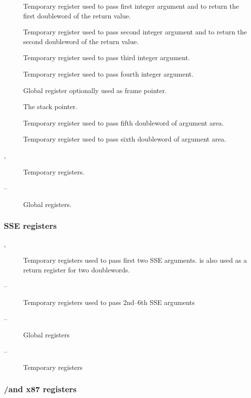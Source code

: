 \begin{description}
  \item [\RAX]
    Temporary register used to pass first integer argument and to return
    the first doubleword of the return value.
  \item [\RDX]
    Temporary register used to pass second integer argument
    and to return the second doubleword of the return value.
  \item [\RCX] Temporary register used to pass third integer argument.
  \item [\RBX] Temporary register used to pass fourth integer argument.
  \item [\RBP] Global register optionally used as frame pointer.
  \item [\RSP] The stack pointer.
  \item [\RSI]
    Temporary register used to pass fifth doubleword of argument area.
  \item [\RDI] 
    Temporary register used to pass sixth doubleword of argument area.
  \item [, ] Temporary registers.
  \item [ -- ] Global registers.
\end{description}

\subsubsection {SSE registers}

\begin{description}
\item [, ] Temporary registers used to pass first
  two SSE arguments.  is also used as a return register for
  two doublewords.
  \item [ -- ] Temporary registers used to pass 2nd--6th SSE arguments
  \item [ -- ] Global registers
  \item [ -- ] Temporary registers
\end{description}

\subsubsection {\MMX/\threednow and x87 registers}

